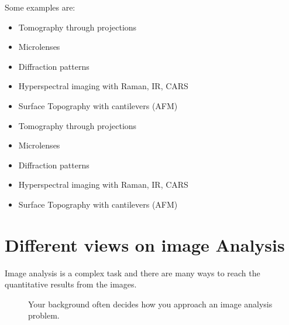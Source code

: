 \documentclass[letterpaper,10pt,english]{sphinxmanual}
\begin{document}
\sphinxAtStartPar
Some examples are:
\begin{itemize}
\item {} 
\sphinxAtStartPar
Tomography through projections

\item {} 
\sphinxAtStartPar
Microlenses 

\item {} 
\sphinxAtStartPar
Diffraction patterns

\item {} 
\sphinxAtStartPar
Hyperspectral imaging with Raman, IR, CARS

\item {} 
\sphinxAtStartPar
Surface Topography with cantilevers (AFM)

\end{itemize}


\begin{itemize}
\item {} 
\sphinxAtStartPar
Tomography through projections

\item {} 
\sphinxAtStartPar
Microlenses 

\end{itemize}


\begin{itemize}
\item {} 
\sphinxAtStartPar
Diffraction patterns

\item {} 
\sphinxAtStartPar
Hyperspectral imaging with Raman, IR, CARS

\item {} 
\sphinxAtStartPar
Surface Topography with cantilevers (AFM)

\end{itemize}




\chapter{Different views on image Analysis}
\label{\detokenize{01-Introduction:different-views-on-image-analysis}}
\sphinxAtStartPar
Image analysis is a complex task and there are many ways to reach the quantitative results from the images.

\begin{figure}[htbp]
\centering
\capstart

\noindent{}
\caption{Your background often decides how you approach an image analysis problem.}\label{\detokenize{01-Introduction:id19}}\end{figure}
\end{document}
